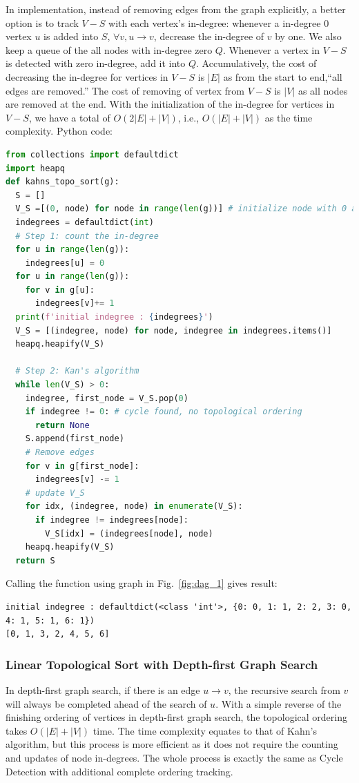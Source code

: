 \documentclass[../main.tex]{subfiles}
\begin{document}
In implementation, instead of removing edges from the graph explicitly, a better option is to track $V-S$ with each vertex's in-degree: whenever a in-degree 0 vertex  $u$ is added into $S$,  $\forall v, u\rightarrow v$,  decrease the in-degree of $v$ by one. We also keep a queue of the all nodes with in-degree zero $Q$. Whenever a vertex in $V-S$ is detected with zero in-degree, add it into $Q$. Accumulatively, the cost of decreasing the in-degree for vertices in $V-S$ is $|E|$ as from the start to end,``all edges are removed.'' The cost of removing of vertex from $V-S$ is $|V|$ as all nodes are removed at the end.  With the initialization of the in-degree for vertices in $V-S$, we have a total of $O(2|E|+|V|)$, i.e., $O(|E|+|V|)$ as the time complexity. Python code:
\begin{lstlisting}[language=Python]
from collections import defaultdict
import heapq 
def kahns_topo_sort(g):
  S = []
  V_S =[(0, node) for node in range(len(g))] # initialize node with 0 as in-degree
  indegrees = defaultdict(int)
  # Step 1: count the in-degree
  for u in range(len(g)):
    indegrees[u] = 0
  for u in range(len(g)):
    for v in g[u]:
      indegrees[v]+= 1
  print(f'initial indegree : {indegrees}')
  V_S = [(indegree, node) for node, indegree in indegrees.items()]
  heapq.heapify(V_S)

  # Step 2: Kan's algorithm
  while len(V_S) > 0:
    indegree, first_node = V_S.pop(0)
    if indegree != 0: # cycle found, no topological ordering
      return None
    S.append(first_node)
    # Remove edges
    for v in g[first_node]:
      indegrees[v] -= 1
    # update V_S
    for idx, (indegree, node) in enumerate(V_S):
      if indegree != indegrees[node]:
        V_S[idx] = (indegrees[node], node)
    heapq.heapify(V_S)
  return S
\end{lstlisting}
Calling the function using graph in Fig.~\ref{fig:dag_1} gives result:
\begin{lstlisting}
initial indegree : defaultdict(<class 'int'>, {0: 0, 1: 1, 2: 2, 3: 0, 4: 1, 5: 1, 6: 1})
[0, 1, 3, 2, 4, 5, 6]
\end{lstlisting}

\subsubsection{Linear Topological Sort with Depth-first Graph Search} In depth-first graph search, if there is an edge $u\rightarrow v$, the recursive search from $v$ will always be completed ahead of the search of $u$.  With a simple reverse of the finishing ordering of vertices in depth-first graph search, the topological ordering takes $O(|E|+|V|)$ time. The time complexity equates to that of Kahn's algorithm, but this process is more efficient as it does not require the counting and updates of node in-degrees.  The whole process is exactly the same as Cycle Detection with additional complete ordering tracking.
\end{document}
